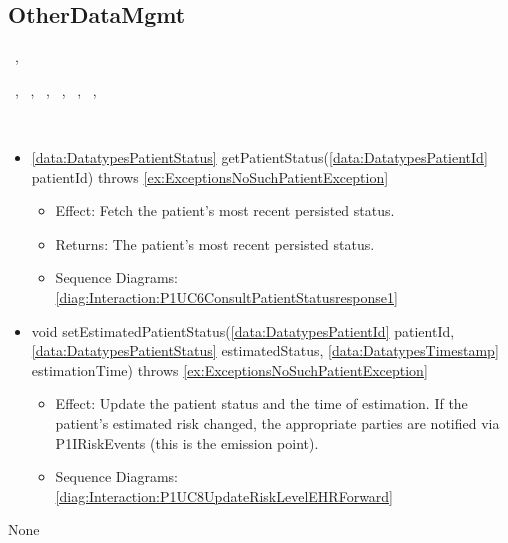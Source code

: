   \subsection{OtherDataMgmt}\label{int:InterfacesOtherDataMgmt}
    \begin{description}
      \item[Provided by:] \iconcomponent{}~, \iconcomponent{}~
      \item[Required by:] \iconcomponent{}~, \iconcomponent{}~, \iconcomponent{}~, \iconcomponent{}~, \iconcomponent{}~, \iconcomponent{}~, \iconcomponent{}~ 
      \item[Operations:] ~
    \begin{itemize}[noitemsep,nolistsep,leftmargin=-.25cm]
      \item \textsf{\ref{data:DatatypesPatientStatus} getPatientStatus(\ref{data:DatatypesPatientId} patientId) throws \ref{ex:ExceptionsNoSuchPatientException}}
        \begin{itemize}[noitemsep,nolistsep]
           \item Effect: Fetch the patient's most recent persisted status. 
           \item Returns: The patient's most recent persisted status.
           \item Sequence Diagrams: \cref{diag:Interaction:P1UC6ConsultPatientStatusresponse1}
        \end{itemize}
      \item \textsf{void setEstimatedPatientStatus(\ref{data:DatatypesPatientId} patientId, \ref{data:DatatypesPatientStatus} estimatedStatus, \ref{data:DatatypesTimestamp} estimationTime) throws \ref{ex:ExceptionsNoSuchPatientException}}
        \begin{itemize}[noitemsep,nolistsep]
           \item Effect: Update the patient status and the time of estimation. If the patient's estimated risk changed, the appropriate parties are notified via P1IRiskEvents (this is the emission point). 
           \item Sequence Diagrams: \cref{diag:Interaction:P1UC8UpdateRiskLevelEHRForward}
        \end{itemize}
    \end{itemize}
      \item[Diagrams:] None
    \end{description}

